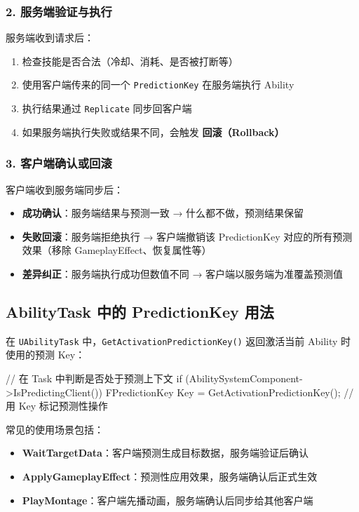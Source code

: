 \documentclass[10pt,CJKmath]{ctexart}
\begin{document}
\subsubsection{2. 服务端验证与执行}

服务端收到请求后：

\begin{enumerate}
	\item 检查技能是否合法（冷却、消耗、是否被打断等）
	\item 使用客户端传来的同一个 \texttt{PredictionKey} 在服务端执行 Ability
	\item 执行结果通过 \texttt{Replicate} 同步回客户端
	\item 如果服务端执行失败或结果不同，会触发 \textbf{回滚（Rollback）}
\end{enumerate}

\subsubsection{3. 客户端确认或回滚}

客户端收到服务端同步后：

\begin{itemize}
	\item \textbf{成功确认}：服务端结果与预测一致 → 什么都不做，预测结果保留
	\item \textbf{失败回滚}：服务端拒绝执行 → 客户端撤销该 PredictionKey 对应的所有预测效果（移除 GameplayEffect、恢复属性等）
	\item \textbf{差异纠正}：服务端执行成功但数值不同 → 客户端以服务端为准覆盖预测值
\end{itemize}

\subsection{AbilityTask 中的 PredictionKey 用法}

在 \texttt{UAbilityTask} 中，\texttt{GetActivationPredictionKey()} 返回激活当前 Ability 时使用的预测 Key：

\begin{code}
	// 在 Task 中判断是否处于预测上下文
	if (AbilitySystemComponent->IsPredictingClient())
	{
		FPredictionKey Key = GetActivationPredictionKey();
		// 用 Key 标记预测性操作
	}
\end{code}

常见的使用场景包括：

\begin{itemize}
	\item \textbf{WaitTargetData}：客户端预测生成目标数据，服务端验证后确认
	\item \textbf{ApplyGameplayEffect}：预测性应用效果，服务端确认后正式生效
	\item \textbf{PlayMontage}：客户端先播动画，服务端确认后同步给其他客户端
\end{itemize}
\end{document}
